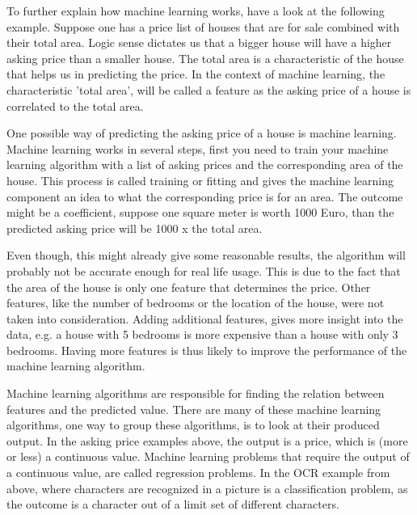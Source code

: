 To further explain how machine learning works, have a look at the following example. Suppose one has a price list of houses that are for sale combined with their total area. Logic sense dictates us that a bigger house will have a higher asking price than a smaller house. The total area is a characteristic of the house that helps us in predicting the price. In the context of machine learning, the characteristic 'total area', will be called a feature as the asking price of a house is correlated to the total area. 

\npar

One possible way of predicting the asking price of a house is machine learning. Machine learning works in several steps, first you need to train your machine learning algorithm with a list of asking prices and the corresponding area of the house. This process is called training or fitting and gives the machine learning component an idea to what the corresponding price is for an area. The outcome might be a coefficient, suppose one square meter is worth 1000 Euro, than the predicted asking price will be 1000 x the total area.

\npar

Even though, this might already give some reasonable results, the algorithm will probably not be accurate enough for real life usage. This is due to the fact that the area of the house is only one feature that determines the price. Other features, like the number of bedrooms or the location of the house, were not taken into consideration. Adding additional features, gives more insight into the data, e.g. a house with 5 bedrooms is more expensive than a house with only 3 bedrooms. Having more features is thus likely to improve the performance of the machine learning algorithm.

\npar

Machine learning algorithms are responsible for finding the relation between features and the predicted value. There are many of these machine learning algorithms, one way to group these algorithms, is to look at their produced output. In the asking price examples above, the output is a price, which is (more or less) a continuous value. Machine learning problems that require the output of a continuous value, are called regression problems. In the OCR example from above, where characters are recognized in a picture is a classification problem, as the outcome is a character out of a limit set of different characters.

\npar

